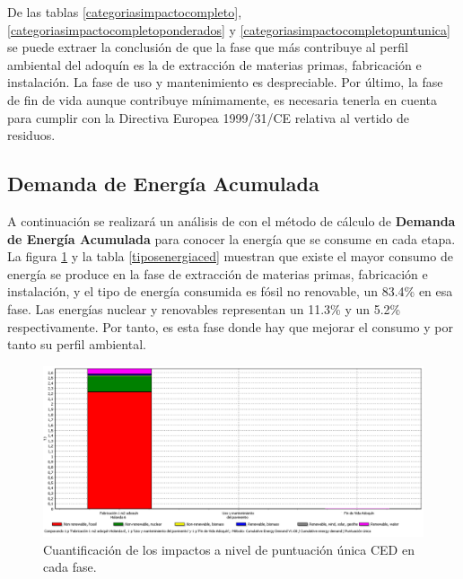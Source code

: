 De las tablas \ref{categoriasimpactocompleto}, \ref{categoriasimpactocompletoponderados} y \ref{categoriasimpactocompletopuntunica} se puede extraer la conclusión de que la fase que más contribuye al perfil ambiental del adoquín es la de extracción de materias primas, fabricación e instalación. La fase de uso y mantenimiento es despreciable. Por último, la fase de fin de vida aunque contribuye mínimamente, es necesaria tenerla en cuenta para cumplir con la Directiva Europea 1999/31/CE relativa al vertido de residuos.

\subsection{Demanda de Energía Acumulada}
A continuación se realizará un análisis de con el método de cálculo de \textbf{Demanda de Energía Acumulada} para conocer la energía que se consume en cada etapa. La figura \ref{fig:ced_puntuacionunica} y la tabla \ref{tiposenergiaced} muestran que existe el mayor consumo de energía se produce en la fase de extracción de materias primas, fabricación e instalación, y el tipo de energía consumida es fósil no renovable, un 83.4\% en esa fase. Las energías nuclear y renovables representan un 11.3\% y un 5.2\% respectivamente. Por tanto, es esta fase donde hay que mejorar el consumo y por tanto su perfil ambiental.


\begin{figure}[!htb]
\centering
\includegraphics[width=15cm]{img/ced_puntuacionunica.png}
\caption{Cuantificación de los impactos a nivel de puntuación única CED en cada fase.}
\label{fig:ced_puntuacionunica}
\end{figure}

